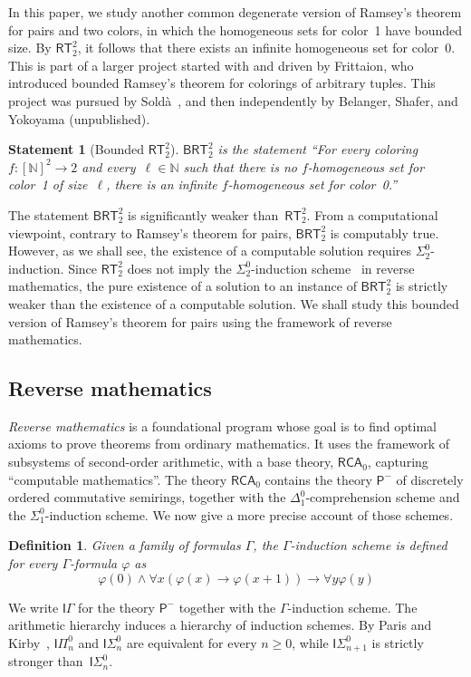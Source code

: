 \documentclass{article}
\newcommand{\Psf}{\mathsf{P}}
\newcommand{\ISig}{\mathsf{I}\Sigma^0}
\newcommand{\IPi}{\mathsf{I}\Pi^0}
\newcommand{\RCA}[0]{\mathsf{RCA}}
\newcommand{\RT}[0]{\mathsf{RT}}
\newcommand{\BRT}[0]{\mathsf{BRT}}
\newcommand{\NN}[0]{\mathbb{N}}
\def\qt#1{``#1''}%
\newtheorem*{statement}{Statement}
\numberwithin{theorem}{section}
\newtheorem{definition}[theorem]{Definition}
\begin{document}
In this paper, we study another common degenerate version of Ramsey's theorem for pairs and two colors, in which the homogeneous sets for color~1 have bounded size. By $\RT^2_2$, it follows that there exists an infinite homogeneous set for color~0. This is part of a larger project started with and driven by Frittaion, who introduced bounded Ramsey's theorem for colorings of arbitrary tuples. This project was pursued by Soldà~\cite[Section 4.1]{solda2021calibrating}, and then independently by Belanger, Shafer, and Yokoyama (unpublished).

\begin{statement}[Bounded $\RT^2_2$]
$\BRT^2_2$ is the statement \qt{For every coloring $f : [\NN]^2 \to 2$ and every~$\ell \in \NN$ such that there is no $f$-homogeneous set for color~1 of size~$\ell$, there is an infinite $f$-homogeneous set for color~0.}
\end{statement}

The statement $\BRT^2_2$ is significantly weaker than~$\RT^2_2$. From a computational viewpoint, contrary to Ramsey's theorem for pairs, $\BRT^2_2$ is computably true. However, as we shall see, the existence of a computable solution requires $\Sigma^0_2$-induction. Since $\RT^2_2$ does not imply the $\Sigma^0_2$-induction scheme~\cite{chong2017inductive} in reverse mathematics, the pure existence of a solution to an instance of $\BRT^2_2$ is strictly weaker than the existence of a computable solution. We shall study this bounded version of Ramsey's theorem for pairs using the framework of reverse mathematics.

\subsection{Reverse mathematics}

\emph{Reverse mathematics} is a foundational program whose goal is to find optimal axioms to prove theorems from ordinary mathematics. It uses the framework of subsystems of second-order arithmetic, with a base theory, $\RCA_0$, capturing \qt{computable mathematics}. The theory $\RCA_0$ contains the theory $\Psf^-$ of discretely ordered commutative semirings, together with the $\Delta^0_1$-comprehension scheme and the $\Sigma^0_1$-induction scheme. We now give a more precise account of those schemes.

\begin{definition}
Given a family of formulas $\Gamma$, the \emph{$\Gamma$-induction scheme} is defined for every $\Gamma$-formula $\varphi$ as
$$
\varphi(0) \wedge \forall x (\varphi(x) \to \varphi(x+1)) \to \forall y \varphi(y)
$$
\end{definition}
\noindent
We write $\mathsf{I}\Gamma$ for the theory $\Psf^-$ together with the $\Gamma$-induction scheme. The arithmetic hierarchy induces a hierarchy of induction schemes. By Paris and Kirby~\cite{paris_n-collection_1978}, $\IPi_n$ and $\ISig_n$ are equivalent for every $n \geq 0$, while $\ISig_{n+1}$ is strictly stronger than~$\ISig_n$.
\bigskip
\end{document}
